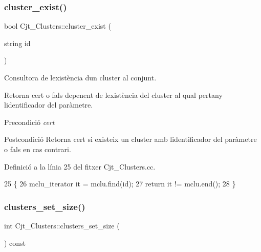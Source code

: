 \subsubsection{\texorpdfstring{cluster\+\_\+exist()}{cluster\_exist()}}
{\footnotesize\ttfamily bool Cjt\+\_\+\+Clusters\+::cluster\+\_\+exist (\begin{DoxyParamCaption}\item[{string}]{id }\end{DoxyParamCaption})}



Consultora de l\textquotesingle{}existència d\textquotesingle{}un cluster al conjunt. 

Retorna cert o fals depenent de l\textquotesingle{}existència del cluster al qual pertany l\textquotesingle{}identificador del paràmetre.

\begin{DoxyPrecond}{Precondició}
{\itshape cert} 
\end{DoxyPrecond}
\begin{DoxyPostcond}{Postcondició}
Retorna cert si existeix un cluster amb l\textquotesingle{}identificador del paràmetre o fals en cas contrari. 
\end{DoxyPostcond}


Definició a la línia 25 del fitxer Cjt\+\_\+\+Clusters.\+cc.


\begin{DoxyCode}
25                                           \{
26     mclu\_iterator it = mclu.find(\textcolor{keywordtype}{id});
27     \textcolor{keywordflow}{return} it != mclu.end();
28 \}
\end{DoxyCode}
\mbox{\label{class_cjt___clusters_a1ecfc9a82c3a0dff467769880c355efd}} 
\subsubsection{\texorpdfstring{clusters\+\_\+set\+\_\+size()}{clusters\_set\_size()}}
{\footnotesize\ttfamily int Cjt\+\_\+\+Clusters\+::clusters\+\_\+set\+\_\+size (\begin{DoxyParamCaption}{ }\end{DoxyParamCaption}) const}



